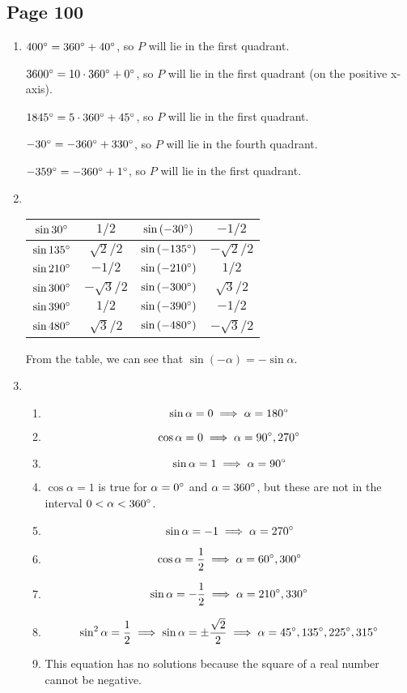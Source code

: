 \documentclass{article}
\newenvironment{solutions}[1]
{\subsection*{#1}
 \begin{enumerate}[leftmargin=1.5em]}
{\end{enumerate}}
\newcommand{\solution}{\item}
\newenvironment{subsolutions}
{\begin{enumerate}}
{\end{enumerate}}
\newcommand{\subsolution}{\item}
\begin{document}
\begin{solutions}{Page 100}
\solution %
$400\degree = 360\degree + 40\degree$, so $P$ will lie in the first quadrant.

$3600\degree = 10 \cdot 360\degree + 0\degree$, so $P$ will lie in the first quadrant (on the positive x-axis).

$1845\degree = 5 \cdot 360\degree + 45\degree$, so $P$ will lie in the first quadrant.

$-30\degree = -360\degree + 330\degree$, so $P$ will lie in the fourth quadrant.

$-359\degree = -360\degree + 1\degree$, so $P$ will lie in the first quadrant.

\solution ~ %
\begin{center}
\bgroup
\def\arraystretch{2.1}
\setlength\tabcolsep{15pt}
\begin{tabular}{ |c|c|c|c| }
\hline
$\sin{30\degree}$
& $1/2$
& $\sin\left(-30\degree\right)$
& $-1/2$ \\
\hline
$\sin{135\degree}$
& $\sqrt{2}/2$
& $\sin\left(-135\degree\right)$
& $-\sqrt{2}/2$ \\
\hline
$\sin{210\degree}$
& $-1/2$
& $\sin\left(-210\degree\right)$
& $1/2$ \\
\hline
$\sin{300\degree}$
& $-\sqrt{3}/2$
& $\sin\left(-300\degree\right)$
& $\sqrt{3}/2$ \\
\hline
$\sin{390\degree}$
& $1/2$
& $\sin\left(-390\degree\right)$
& $-1/2$ \\
\hline
$\sin{480\degree}$
& $\sqrt{3}/2$
& $\sin\left(-480\degree\right)$
& $-\sqrt{3}/2$ \\
\hline
\end{tabular}
\egroup
\end{center}

From the table, we can see that $\sin\left(-\alpha\right)=-\sin{\alpha}$.

\solution %
\begin{subsolutions}
\subsolution %
\[
\sin{\alpha}=0 \implies \alpha=180\degree
\]
\subsolution %
\[
\cos{\alpha}=0 \implies \alpha=90\degree, 270\degree
\]
\subsolution %
\[
\sin{\alpha}=1 \implies \alpha=90\degree
\]
\subsolution %
$\cos{\alpha}=1$ is true for $\alpha=0\degree$ and $\alpha=360\degree$, but these are not in the interval $0 < \alpha < 360\degree$.
\subsolution %
\[
\sin{\alpha}=-1 \implies \alpha=270\degree
\]
\subsolution %
\[
\cos{\alpha}=\dfrac{1}{2} \implies \alpha=60\degree,300\degree
\]
\subsolution %
\[
\sin{\alpha}=-\dfrac{1}{2} \implies \alpha=210\degree,330\degree
\]
\subsolution %
\[
\sin^{2}{\alpha} = \dfrac{1}{2} \implies \sin{\alpha} = \pm \dfrac{\sqrt{2}}{2} \implies \alpha=45\degree,135\degree,225\degree,315\degree
\]
\subsolution %
This equation has no solutions because the square of a real number cannot be negative.


\end{subsolutions}
\end{solutions}
\end{document}

